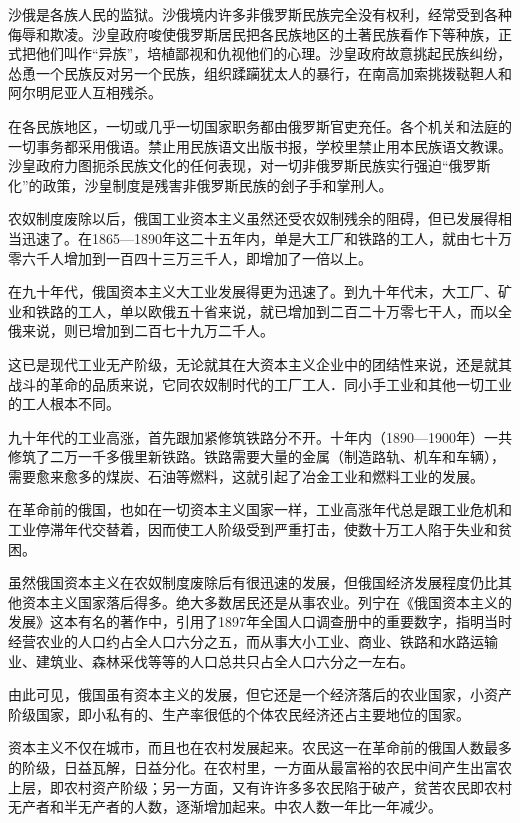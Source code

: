 沙俄是各族人民的监狱。沙俄境内许多非俄罗斯民族完全没有权利，经常受到各种侮辱和欺凌。沙皇政府唆使俄罗斯居民把各民族地区的土著民族看作下等种族，正式把他们叫作“异族”，培植鄙视和仇视他们的心理。沙皇政府故意挑起民族纠纷，怂恿一个民族反对另一个民族，组织蹂躏犹太人的暴行，在南高加索挑拨鞑靼人和阿尔明尼亚人互相残杀。

在各民族地区，一切或几乎一切国家职务都由俄罗斯官吏充任。各个机关和法庭的一切事务都采用俄语。禁止用民族语文出版书报，学校里禁止用本民族语文教课。沙皇政府力图扼杀民族文化的任何表现，对一切非俄罗斯民族实行强迫“俄罗斯化”的政策，沙皇制度是残害非俄罗斯民族的刽子手和掌刑人。

农奴制度废除以后，俄国工业资本主义虽然还受农奴制残余的阻碍，但已发展得相当迅速了。在1865—1890年这二十五年内，单是大工厂和铁路的工人，就由七十万零六千人增加到一百四十三万三千人，即增加了一倍以上。

在九十年代，俄国资本主义大工业发展得更为迅速了。到九十年代末，大工厂、矿业和铁路的工人，单以欧俄五十省来说，就已增加到二百二十万零七干人，而以全俄来说，则已增加到二百七十九万二千人。

这已是现代工业无产阶级，无论就其在大资本主义企业中的团结性来说，还是就其战斗的革命的品质来说，它同农奴制时代的工厂工人．同小手工业和其他一切工业的工人根本不同。

九十年代的工业高涨，首先跟加紧修筑铁路分不开。十年内（1890—1900年）一共修筑了二万一千多俄里新铁路。铁路需要大量的金属（制造路轨、机车和车辆），需要愈来愈多的煤炭、石油等燃料，这就引起了冶金工业和燃料工业的发展。

在革命前的俄国，也如在一切资本主义国家一样，工业高涨年代总是跟工业危机和工业停滞年代交替着，因而使工人阶级受到严重打击，使数十万工人陷于失业和贫困。

虽然俄国资本主义在农奴制度废除后有很迅速的发展，但俄国经济发展程度仍比其他资本主义国家落后得多。绝大多数居民还是从事农业。列宁在《俄国资本主义的发展》这本有名的著作中，引用了1897年全国人口调查册中的重要数字，指明当时经营农业的人口约占全人口六分之五，而从事大小工业、商业、铁路和水路运输业、建筑业、森林采伐等等的人口总共只占全人口六分之一左右。

由此可见，俄国虽有资本主义的发展，但它还是一个经济落后的农业国家，小资产阶级国家，即小私有的、生产率很低的个体农民经济还占主要地位的国家。

资本主义不仅在城市，而且也在农村发展起来。农民这一在革命前的俄国人数最多的阶级，日益瓦解，日益分化。在农村里，一方面从最富裕的农民中间产生出富农上层，即农村资产阶级；另一方面，又有许许多多农民陷于破产，贫苦农民即农村无产者和半无产者的人数，逐渐增加起来。中农人数一年比一年减少。

